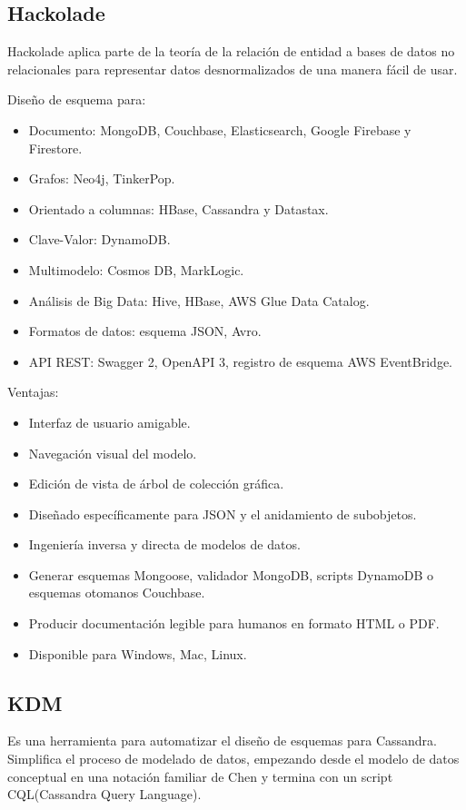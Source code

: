 \subsection{Hackolade}
Hackolade aplica parte de la teoría de la relación de entidad a bases de datos no  relacionales para representar datos desnormalizados de una manera fácil de usar.


Diseño de esquema para:

\begin{itemize}
	\item Documento: MongoDB, Couchbase, Elasticsearch, Google Firebase y Firestore.
	\item Grafos: Neo4j, TinkerPop.
	\item Orientado a columnas: HBase, Cassandra y Datastax.
	\item Clave-Valor: DynamoDB.
	\item Multimodelo: Cosmos DB, MarkLogic.
	\item Análisis de Big Data: Hive, HBase, AWS Glue Data Catalog.
	\item Formatos de datos: esquema JSON, Avro.
	\item API REST: Swagger 2, OpenAPI 3, registro de esquema AWS EventBridge.
	
\end{itemize}
Ventajas:
\begin{itemize}
	\item Interfaz de usuario amigable.
	\item Navegación visual del modelo.
	\item Edición de vista de árbol de colección gráfica.
	\item Diseñado específicamente para JSON y el anidamiento de subobjetos.
	\item Ingeniería inversa y directa de modelos de datos.
	\item Generar esquemas Mongoose, validador MongoDB, scripts DynamoDB o esquemas otomanos Couchbase.
	\item Producir documentación legible para humanos en formato HTML o PDF.
	\item Disponible para Windows, Mac, Linux.
\end{itemize}
\subsection{KDM}
Es una herramienta para automatizar el diseño de esquemas para Cassandra. Simplifica el proceso de modelado de datos, empezando desde el modelo de datos conceptual en una notación familiar de Chen y termina con un  script CQL(Cassandra Query Language).

